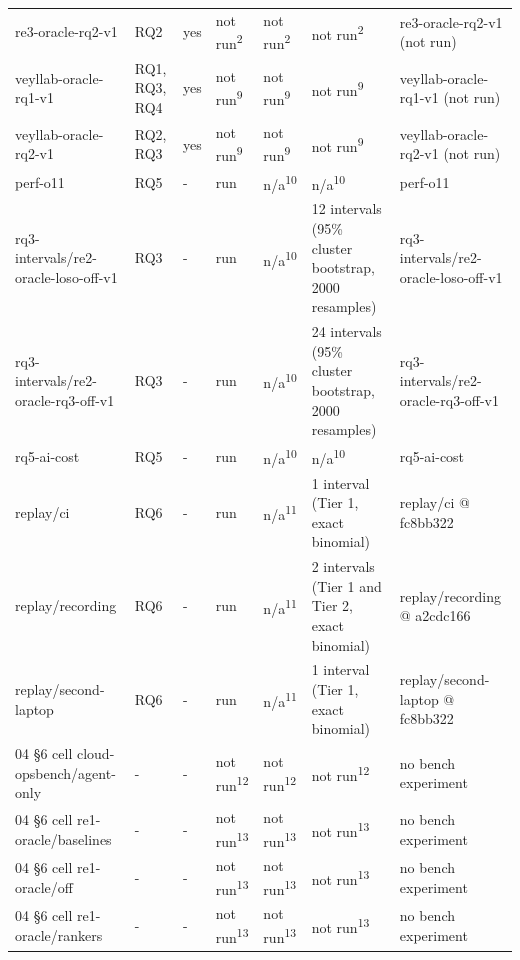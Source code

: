 \begin{table}[t]
\begin{tabular}{lllllll}
re3-oracle-rq2-v1 & RQ2 & yes & not run\textsuperscript{2} & not run\textsuperscript{2} & not run\textsuperscript{2} & re3-oracle-rq2-v1 (not run) \\
veyllab-oracle-rq1-v1 & RQ1, RQ3, RQ4 & yes & not run\textsuperscript{9} & not run\textsuperscript{9} & not run\textsuperscript{9} & veyllab-oracle-rq1-v1 (not run) \\
veyllab-oracle-rq2-v1 & RQ2, RQ3 & yes & not run\textsuperscript{9} & not run\textsuperscript{9} & not run\textsuperscript{9} & veyllab-oracle-rq2-v1 (not run) \\
perf-o11 & RQ5 & - & run & n/a\textsuperscript{10} & n/a\textsuperscript{10} & perf-o11 \\
rq3-intervals/re2-oracle-loso-off-v1 & RQ3 & - & run & n/a\textsuperscript{10} & 12 intervals (95\% cluster bootstrap, 2000 resamples) & rq3-intervals/re2-oracle-loso-off-v1 \\
rq3-intervals/re2-oracle-rq3-off-v1 & RQ3 & - & run & n/a\textsuperscript{10} & 24 intervals (95\% cluster bootstrap, 2000 resamples) & rq3-intervals/re2-oracle-rq3-off-v1 \\
rq5-ai-cost & RQ5 & - & run & n/a\textsuperscript{10} & n/a\textsuperscript{10} & rq5-ai-cost \\
replay/ci & RQ6 & - & run & n/a\textsuperscript{11} & 1 interval (Tier 1, exact binomial) & replay/ci @ fc8bb322 \\
replay/recording & RQ6 & - & run & n/a\textsuperscript{11} & 2 intervals (Tier 1 and Tier 2, exact binomial) & replay/recording @ a2cdc166 \\
replay/second-laptop & RQ6 & - & run & n/a\textsuperscript{11} & 1 interval (Tier 1, exact binomial) & replay/second-laptop @ fc8bb322 \\
04 \S{}6 cell cloud-opsbench/agent-only & - & - & not run\textsuperscript{12} & not run\textsuperscript{12} & not run\textsuperscript{12} & no bench experiment \\
04 \S{}6 cell re1-oracle/baselines & - & - & not run\textsuperscript{13} & not run\textsuperscript{13} & not run\textsuperscript{13} & no bench experiment \\
04 \S{}6 cell re1-oracle/off & - & - & not run\textsuperscript{13} & not run\textsuperscript{13} & not run\textsuperscript{13} & no bench experiment \\
04 \S{}6 cell re1-oracle/rankers & - & - & not run\textsuperscript{13} & not run\textsuperscript{13} & not run\textsuperscript{13} & no bench experiment \\

\end{tabular}
\end{table}
